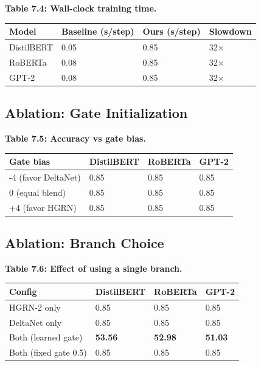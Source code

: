 \textbf{Table 7.4: Wall-clock training time.}

\begin{table}[H]
\centering
\small
\begin{tabular}{llll}
\toprule
\textbf{Model} & \textbf{Baseline (s/step)} & \textbf{Ours (s/step)} & \textbf{Slowdown} \\
\midrule
DistilBERT & 0.05 & 0.85 & 32$\times$ \\
RoBERTa & 0.08 & 0.85 & 32$\times$ \\
GPT-2 & 0.08 & 0.85 & 32$\times$ \\
\bottomrule
\end{tabular}
\end{table}

\subsection{Ablation: Gate Initialization}

\textbf{Table 7.5: Accuracy vs gate bias.}

\begin{table}[H]
\centering
\small
\begin{tabular}{llll}
\toprule
\textbf{Gate bias} & \textbf{DistilBERT} & \textbf{RoBERTa} & \textbf{GPT-2} \\
\midrule
-4 (favor DeltaNet) & 0.85 & 0.85 & 0.85 \\
0 (equal blend) & 0.85 & 0.85 & 0.85 \\
+4 (favor HGRN) & 0.85 & 0.85 & 0.85 \\
\bottomrule
\end{tabular}
\end{table}

\subsection{Ablation: Branch Choice}

\textbf{Table 7.6: Effect of using a single branch.}

\begin{table}[H]
\centering
\small
\begin{tabular}{llll}
\toprule
\textbf{Config} & \textbf{DistilBERT} & \textbf{RoBERTa} & \textbf{GPT-2} \\
\midrule
HGRN-2 only & 0.85 & 0.85 & 0.85 \\
DeltaNet only & 0.85 & 0.85 & 0.85 \\
Both (learned gate) & \textbf{53.56} & \textbf{52.98} & \textbf{51.03} \\
Both (fixed gate 0.5) & 0.85 & 0.85 & 0.85 \\
\bottomrule
\end{tabular}
\end{table}

